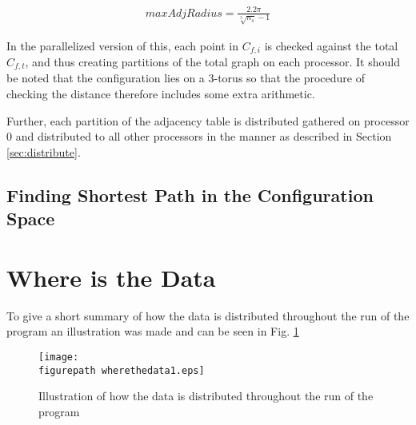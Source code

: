 \begin{align}
\label{eq:}
  maxAdjRadius=\frac{2.2\pi}{\sqrt[3]{n_s}-1}
 \end{align}

 In the parallelized version of this, each point in $C_{f,i}$ is checked against the total $C_{f,t}$, and thus creating partitions of the total graph on each processor. It should be noted that the configuration lies on a 3-torus so that the procedure of checking the distance therefore includes some extra arithmetic. 

Further, each partition of the adjacency table is distributed gathered on processor 0 and distributed to all other processors in the manner as described in Section \ref{sec:distribute}.

\subsection{\textbf{Finding Shortest Path in the Configuration Space}}


\section{\textbf{	Where is the Data}}
To give a short summary of how the data is distributed throughout the run of the program an illustration was made and can be seen in Fig. \ref{fig:wheresthedata}

\begin{figure}[h!] 
 \center 
 \texttt{[image: \\figurepath wherethedata1.eps]}
 \caption{ Illustration of how the data is distributed throughout the run of the program \label{fig:wheresthedata}}
 \end{figure}



 















